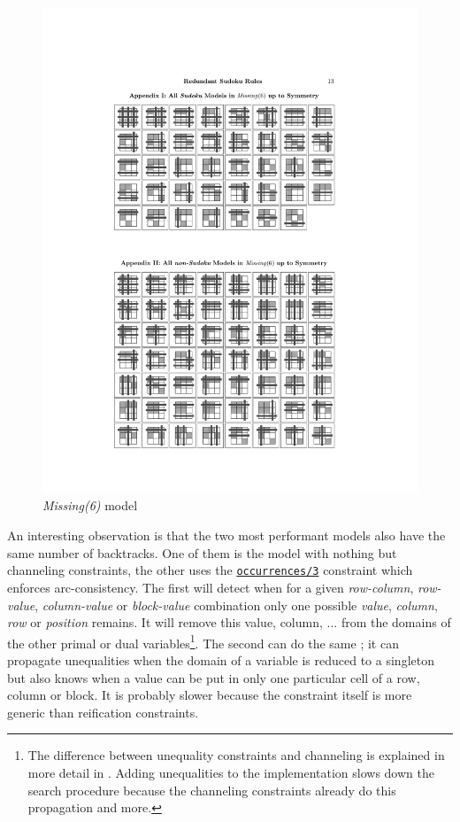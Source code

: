 \begin{figure}[H]
\centering
\includegraphics{misc/missing6}
\caption{\textit{Missing(6)} model}
\label{fig:missing6}
\end{figure}

An interesting observation is that the two most performant models also have the same number of backtracks. One of them is the model with nothing but channeling constraints, the other uses the \href{http://eclipseclp.org/doc/bips/lib/ic_global/occurrences-3.html}{\texttt{occurrences/3}} constraint which enforces arc-consistency. The first will detect when for a given \textit{row-column}, \textit{row-value}, \textit{column-value} or \textit{block-value} combination only one possible \textit{value}, \textit{column}, \textit{row} or \textit{position} remains. It will remove this value, column, ... from the domains of the other primal or dual variables\footnote{The difference between unequality constraints and channeling is explained in more detail in \cite{article:channeling}. Adding unequalities to the implementation slows down the search procedure because the channeling constraints already do this propagation and more.}. The second can do the same ; it can propagate unequalities when the domain of a variable is reduced to a singleton but also knows when a value can be put in only one particular cell of a row, column or block. It is probably slower because the constraint itself is more generic than reification constraints.\\\par


